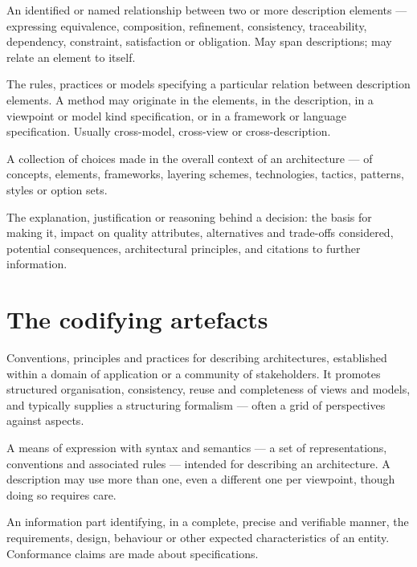 \documentclass[11pt,a4paper]{report}
\begin{document}
\begin{description}[style=nextline,leftmargin=6mm,labelindent=0pt,font=\sffamily\bfseries\color{navy}]
\item[Correspondence]
  An identified or named relationship between two or more description elements
  --- expressing equivalence, composition, refinement, consistency,
  traceability, dependency, constraint, satisfaction or obligation. May span
  descriptions; may relate an element to itself.
\item[Correspondence method]
  The rules, practices or models specifying a particular relation between
  description elements. A method may originate in the elements, in the
  description, in a viewpoint or model kind specification, or in a framework or
  language specification. Usually cross-model, cross-view or cross-description.
\item[Architecture decision]
  A collection of choices made in the overall context of an architecture ---
  of concepts, elements, frameworks, layering schemes, technologies, tactics,
  patterns, styles or option sets.
\item[Architecture rationale]
  The explanation, justification or reasoning behind a decision: the basis for
  making it, impact on quality attributes, alternatives and trade-offs
  considered, potential consequences, architectural principles, and citations
  to further information.
\end{description}

\section{The codifying artefacts}

\begin{description}[style=nextline,leftmargin=6mm,labelindent=0pt,font=\sffamily\bfseries\color{navy}]
\item[Architecture description framework]
  Conventions, principles and practices for describing architectures,
  established within a domain of application or a community of stakeholders. It
  promotes structured organisation, consistency, reuse and completeness of views
  and models, and typically supplies a structuring formalism --- often a grid of
  perspectives against aspects.
\item[Architecture description language]
  A means of expression with syntax and semantics --- a set of representations,
  conventions and associated rules --- intended for describing an architecture.
  A description may use more than one, even a different one per viewpoint,
  though doing so requires care.
\item[Specification]
  An information part identifying, in a complete, precise and verifiable manner,
  the requirements, design, behaviour or other expected characteristics of an
  entity. Conformance claims are made about specifications.
\end{description}
\end{document}
